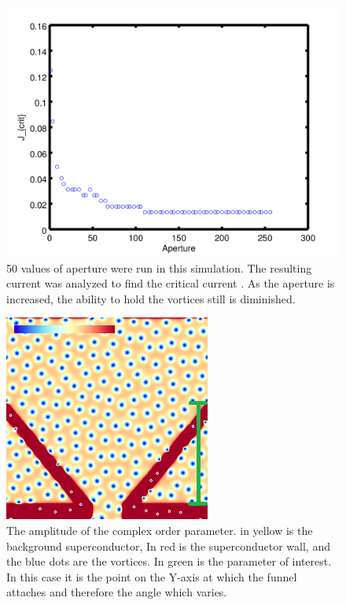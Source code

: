 \begin{figure}[htbp]
\begin{center}
\includegraphics[scale=.50]{funnelX.png}
\caption{ 50 values of aperture were run in this simulation. The resulting current was analyzed to find the critical current . As the aperture is increased, the ability to hold the vortices still is diminished. }
\label{normalXscan}
\end{center}
\end{figure}

\begin{figure}[htbp]
\begin{center}
\includegraphics[scale=.50]{normalY.png}
\caption{ The amplitude of the complex order parameter. in yellow is the background superconductor, In red is the superconductor wall, and the blue dots are the vortices. In green is the parameter of interest. In this case it is the point on the Y-axis at which the funnel attaches and therefore the angle which varies. }
\label{normalY}
\end{center}
\end{figure}

